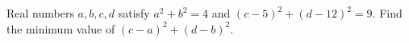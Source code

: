 Real numbers $a,b,c,d$ satisfy $a^2+b^2=4$ and $(c-5)^2+(d-12)^2=9$. Find the minimum value of $(c-a)^2+(d-b)^2.$
